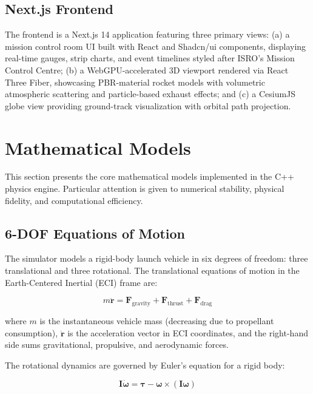 \documentclass[conference]{IEEEtran}
\newcommand{\vect}[1]{\boldsymbol{#1}}
\newcommand{\mat}[1]{\mathbf{#1}}
\begin{document}
\subsection{Next.js Frontend}
The frontend is a Next.js 14 application featuring three primary views: (a) a mission control room UI built with React and Shadcn/ui components, displaying real-time gauges, strip charts, and event timelines styled after ISRO's Mission Control Centre; (b) a WebGPU-accelerated 3D viewport rendered via React Three Fiber, showcasing PBR-material rocket models with volumetric atmospheric scattering and particle-based exhaust effects; and (c) a CesiumJS globe view providing ground-track visualization with orbital path projection.

\section{Mathematical Models}

This section presents the core mathematical models implemented in the C++ physics engine. Particular attention is given to numerical stability, physical fidelity, and computational efficiency.

\subsection{6-DOF Equations of Motion}

The simulator models a rigid-body launch vehicle in six degrees of freedom: three translational and three rotational. The translational equations of motion in the Earth-Centered Inertial (ECI) frame are:

\begin{equation}
    m \ddot{\vect{r}} = \vect{F}_{\text{gravity}} + \vect{F}_{\text{thrust}} + \vect{F}_{\text{drag}}
    \label{eq:translational}
\end{equation}

\noindent where $m$ is the instantaneous vehicle mass (decreasing due to propellant consumption), $\ddot{\vect{r}}$ is the acceleration vector in ECI coordinates, and the right-hand side sums gravitational, propulsive, and aerodynamic forces.

The rotational dynamics are governed by Euler's equation for a rigid body:

\begin{equation}
    \mat{I} \dot{\vect{\omega}} = \vect{\tau} - \vect{\omega} \times (\mat{I} \vect{\omega})
    \label{eq:rotational}
\end{equation}
\end{document}
